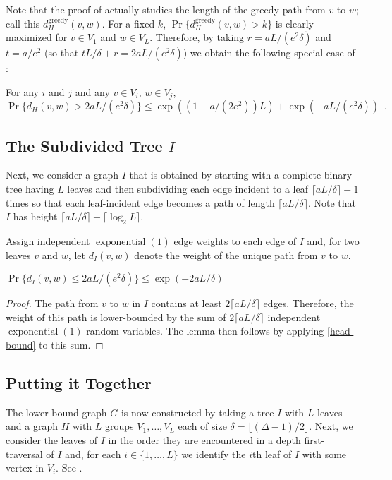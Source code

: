 \documentclass[lotsofwhite]{patmorin}
\DeclareMathOperator{\exponential}{exponential}
\begin{document}
Note that the proof of  actually studies the length of
the greedy path from $v$ to $w$; call this $d_H^{\mathrm{greedy}}(v,w)$.
For a fixed $k$, $\Pr\{d_H^{\mathrm{greedy}}(v,w) > k\}$ is clearly
maximized for $v\in V_1$ and $w\in V_L$. Therefore, by taking
$r=aL/(e^2\delta)$ and $t=a/e^2$ (so that $tL/\delta+r = 2aL/(e^2\delta)$)
we obtain the following special case of :

\begin{cor}
  For any $i$ and $j$ and any $v\in V_i$, $w\in V_j$, 
  \[
    \Pr\{d_H(v,w) > 2aL/(e^2\delta)\} 
        \le \exp((1-a/(2e^2))L) + \exp(-aL/(e^2\delta)) \enspace . 
  \]
\end{cor}

\subsection{The Subdivided Tree $I$}

Next, we consider a graph $I$ that is obtained by starting with a complete
binary tree having $L$ leaves and then subdividing each edge incident
to a leaf $\lceil aL/\delta\rceil-1$ times so that each leaf-incident
edge becomes a path of length $\lceil aL/\delta\rceil$.  Note that $I$
has height $\lceil aL/\delta\rceil+\lceil\log_2 L\rceil$.

Assign independent $\exponential(1)$ edge weights to each edge of $I$
and, for two leaves $v$ and $w$, let $d_I(v,w)$ denote the weight of
the unique path from $v$ to $w$.

\begin{lem}
   $\Pr\{d_I(v,w) \le 2aL/(e^2\delta)\} \le \exp(-2aL/\delta)$
\end{lem}

\begin{proof}
  The path from $v$ to $w$ in $I$ contains at least $2\lceil
  aL/\delta\rceil$ edges.  Therefore, the weight of this path is
  lower-bounded by the sum of $2\lceil aL/\delta\rceil$ independent
  $\exponential(1)$ random variables.  The lemma then follows by applying
  \eqref{head-bound} to this sum.
\end{proof}


\subsection{Putting it Together}

The lower-bound graph $G$ is now constructed by taking a tree $I$ with
$L$ leaves and a graph $H$ with $L$ groups $V_1,\ldots,V_L$ each of size
$\delta=\lfloor(\Delta-1)/2\rfloor$.  Next, we consider the leaves of
$I$ in the order they are encountered in a depth first-traversal of $I$
and, for each $i\in\{1,\ldots,L\}$ we identify the $i$th leaf of $I$
with some vertex in $V_i$.  See .
\end{document}
